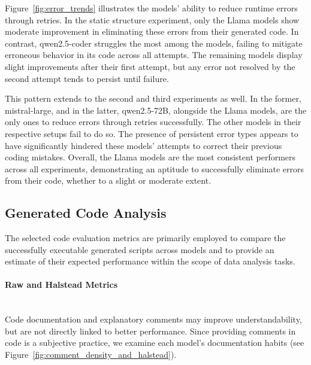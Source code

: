 \documentclass{DESSThesis}
\begin{document}
Figure~\ref{fig:error_trends} illustrates the models' ability to reduce runtime errors through retries. In the static structure experiment, only the Llama models show moderate improvement in eliminating these errors from their generated code. In contrast, qwen2.5-coder struggles the most among the models, failing to mitigate erroneous behavior in its code across all attempts. The remaining models display slight improvements after their first attempt, but any error not resolved by the second attempt tends to persist until failure.

This pattern extends to the second and third experiments as well. In the former, mistral-large, and in the latter, qwen2.5-72B, alongside the Llama models, are the only ones to reduce errors through retries successfully. The other models in their respective setups fail to do so. The presence of persistent error types appears to have significantly hindered these models' attempts to correct their previous coding mistakes. Overall, the Llama models are the most consistent performers across all experiments, demonstrating an aptitude to successfully eliminate errors from their code, whether to a slight or moderate extent.

\subsection{Generated Code Analysis}

The selected code evaluation metrics are primarily employed to compare the successfully executable generated scripts across models and to provide an estimate of their expected performance within the scope of data analysis tasks.

\paragraph{Raw and Halstead Metrics}\mbox{}\\

\noindent Code documentation and explanatory comments may improve understandability, but are not directly linked to better performance. Since providing comments in code is a subjective practice, we examine each model's documentation habits (see Figure~\ref{fig:comment_density_and_halstead}).
\end{document}
